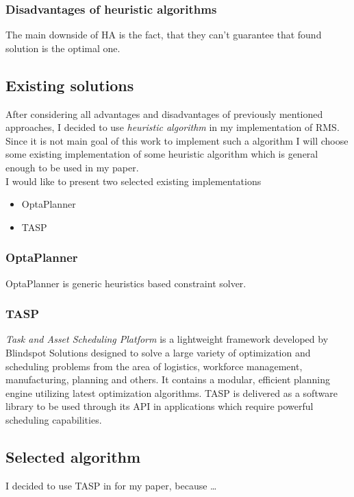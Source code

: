 \subsubsection{Disadvantages of heuristic algorithms}
The main downside of HA is the fact, that they can't guarantee that found solution is the optimal one.

\subsection{Existing solutions}\label{subsec:existing-solutions}
After considering all advantages and disadvantages of previously mentioned approaches, I decided to use \textit{heuristic algorithm}
in my implementation of RMS\@.
Since it is not main goal of this work to implement such a algorithm I will choose some existing implementation of some heuristic algorithm which
is general enough to be used in my paper.\\
I would like to present two selected existing implementations
\begin{itemize}
    \item OptaPlanner
    \item TASP
\end{itemize}

\subsubsection{OptaPlanner}
OptaPlanner is generic heuristics based constraint solver.

\subsubsection{TASP}
\textit{Task and Asset Scheduling Platform}  is a lightweight framework developed by Blindspot Solutions designed to solve a large
variety of optimization and scheduling problems from the area of logistics, workforce management, manufacturing, planning and others.
It contains a modular, efficient planning engine utilizing latest optimization algorithms.
TASP is delivered as a software library to be used through its API in applications which require powerful scheduling capabilities.

\subsection{Selected algorithm}\label{subsec:selected-algorithm2}
I decided to use TASP in for my paper, because \ldots %

